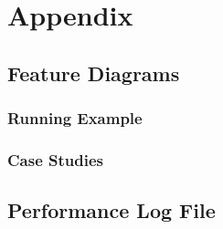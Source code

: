 \appendix
\chapter{Appendix}
\label{appendix}

\section{Feature Diagrams}
\label{feature_diagrams}

\subsection{Running Example}



\subsection{Case Studies}



\section{Performance Log File}
